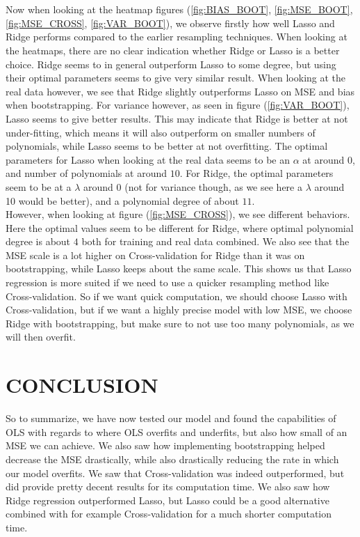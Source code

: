 \documentclass[english,notitlepage,reprint,nofootinbib]{revtex4-1}  %
\begin{document}
\\
\\
Now when looking at the heatmap figures (\ref{fig:BIAS_BOOT}, \ref{fig:MSE_BOOT}, \ref{fig:MSE_CROSS}, \ref{fig:VAR_BOOT}), we observe firstly how well Lasso and Ridge performs compared to the earlier resampling techniques. When looking at the heatmaps, there are no clear indication whether Ridge or Lasso is a better choice. Ridge seems to in general outperform Lasso to some degree, but using their optimal parameters seems to give very similar result. When looking at the real data however, we see that Ridge slightly outperforms Lasso on MSE and bias when bootstrapping. For variance however, as seen in figure (\ref{fig:VAR_BOOT}), Lasso seems to give better results. This may indicate that Ridge is better at not under-fitting, which means it will also outperform on smaller numbers of polynomials, while Lasso seems to be better at not overfitting. The optimal parameters for Lasso when looking at the real data seems to be an $\alpha$ at around 0, and number of polynomials at around $10$. For Ridge, the optimal parameters seem to be at a $\lambda$ around $0$ (not for variance though, as we see here a $\lambda$ around 10 would be better), and a polynomial degree of about $11$.
\\
However, when looking at figure (\ref{fig:MSE_CROSS}), we see different behaviors. Here the optimal values seem to be different for Ridge, where optimal polynomial degree is about $4$ both for training and real data combined. We also see that the MSE scale is a lot higher on Cross-validation for Ridge than it was on bootstrapping, while Lasso keeps about the same scale. This shows us that Lasso regression is more suited if we need to use a quicker resampling method like Cross-validation. So if we want quick computation, we should choose Lasso with Cross-validation, but if we want a highly precise model with low MSE, we choose Ridge with bootstrapping, but make sure to not use too many polynomials, as we will then overfit.


\section{CONCLUSION}\label{sec:CONCLUSION}
    So to summarize, we have now tested our model and found the capabilities of OLS with regards to where OLS overfits and underfits, but also how small of an MSE we can achieve. We also saw how implementing bootstrapping helped decrease the MSE drastically, while also drastically reducing the rate in which our model overfits. We saw that Cross-validation was indeed outperformed, but did provide pretty decent results for its computation time. We also saw how Ridge regression outperformed Lasso, but Lasso could be a good alternative combined with for example Cross-validation for a much shorter computation time.
\end{document}

